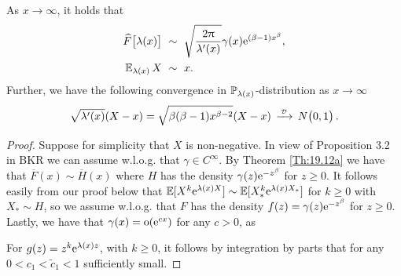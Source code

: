\begin{proposition}\label{Prop:18.12a} As $x\to\infty$, it holds that
	\begin{align}\label{18.12a} \widehat  F\bigl[\lambda(x)\bigr]\ &\sim\ \sqrt{\frac{2\uppi}{\lambda'(x)}}\gamma(x)\mathrm{e}^{(\beta-1)x^\beta},\\
	\label{18.12b}\operatorname{{\mathbb E}}_{\lambda(x)}X\ &\sim\ x.
	\end{align}
	Further, we have the following convergence in $\operatorname{{\mathbb P}}_{\lambda(x)}$-distribution as $x\to \infty$ 
	\begin{align} \label{18.13}
	\sqrt{\lambda'(x)}(X-x)=\sqrt{\beta(\beta-1) x^{\beta-2}}(X-x)\,\xrightarrow{\:\scriptscriptstyle\smash{\mathcal{D}}\:}\,N\bigl(0,1\bigr) \,.
	\end{align}
\end{proposition}
\begin{proof}
	Suppose for simplicity that $X$ is non-negative.
	In view of Proposition 3.2 in BKR we can assume w.l.o.g. that $\gamma \in C^\infty$. 
	By Theorem \ref{Th:19.12a} we have that $\overline{F}(x) \sim \overline{H}(x)$ where $H$ has the density $\gamma(z) \mathrm{e}^{-z^\beta}$ for $z \ge 0$.
	It follows easily from our proof below that $\operatorname{{\mathbb E}}[X^k \mathrm{e}^{\lambda(x) X}] \sim \operatorname{{\mathbb E}}[X^k_* \mathrm{e}^{\lambda(x) X_*}]$ for $k \ge 0$ with $X_* \sim H$, so we assume w.l.o.g. that $F$ has the density $f(z)= \gamma(z) \mathrm{e}^{-z^\beta}$ for $z \ge 0$. 
	Lastly, we have that $\gamma(x)= {\mathrm{o}}(\mathrm{e}^{cx})$ for any $c>0$, as

	For $g(z)= z^k \mathrm{e}^{\lambda(x) z}$, with $k\ge 0$, it follows by integration by parts that
	for any $0< c_1< \tilde c_1< 1$ sufficiently small. 


\end{proof}
